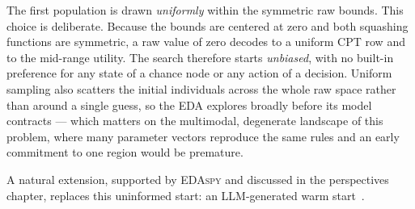 The first population is drawn \emph{uniformly} within the symmetric raw
bounds. This choice is deliberate. Because the bounds are centered at
zero and both squashing functions are symmetric, a raw value of
zero decodes to a uniform CPT row and to the mid-range utility. The
search therefore starts \emph{unbiased}, with no built-in preference for
any state of a chance node or any action of a decision. Uniform sampling
also scatters the initial individuals across the whole raw space rather
than around a single guess, so the EDA explores broadly before its model
contracts — which matters on the multimodal, degenerate landscape of
this problem, where many parameter vectors reproduce the same rules and
an early commitment to one region would be premature.

A natural extension, supported by \textsc{EDAspy} and discussed
in the perspectives chapter, replaces this uninformed start: an
LLM-generated warm start~\cite{nafar2025llm4bn}.



